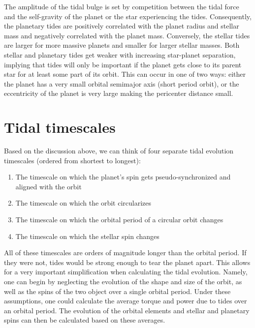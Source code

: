 The amplitude of the tidal bulge is set by competition between the tidal force
and the self-gravity of the planet or the star experiencing the tides.
Consequently, the planetary tides are positively correlated with the planet
radius and stellar mass and negatively correlated with the planet mass.
Conversely, the stellar tides are larger for more massive planets and smaller
for larger stellar masses. Both stellar and planetary tides get weaker with
increasing star-planet separation, implying that tides will only be important if
the planet gets close to its parent star for at least some part of its orbit.
This can occur in one of two ways: either the planet has a very small orbital
semimajor axis (short period orbit), or the eccentricity of the planet is very
large making the pericenter distance small.

\section{Tidal timescales}
%
\label{sec:timescales}

Based on the discussion above, we can think of four separate tidal evolution
timescales (ordered from shortest to longest):

\begin{enumerate}
%
    \item The timescale on which the planet's spin gets pseudo-synchronized and
        aligned with the orbit
%
    \item The timescale on which the orbit circularizes
%
    \item The timescale on which the orbital period of a circular orbit changes
%
    \item The timescale on which the stellar spin changes
%
\end{enumerate}

All of these timescales are orders of magnitude longer than the orbital period.
If they were not, tides would be strong enough to tear the planet apart. This
allows for a very important simplification when calculating the tidal evolution.
Namely, one can begin by neglecting the evolution of the shape and size of the
orbit, as well as the spins of the two object over a single orbital period.
Under these assumptions, one could calculate the average torque and power due to
tides over an orbital period. The evolution of the orbital elements and stellar
and planetary spins can then be calculated based on these averages.

